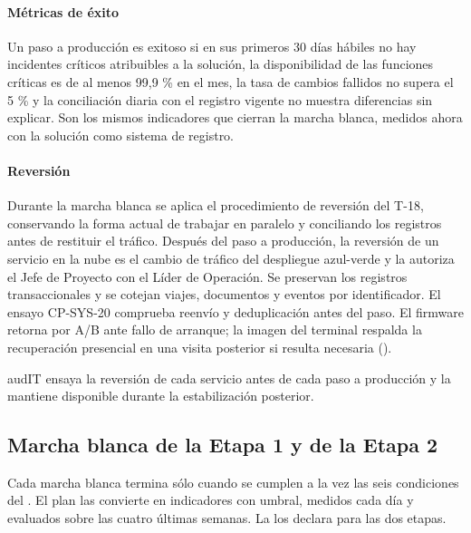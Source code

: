 \paragraph{Métricas de éxito}
Un paso a producción es exitoso si en sus primeros 30 días hábiles no hay incidentes críticos atribuibles
a la solución, la disponibilidad de las funciones críticas es de al menos 99,9 \% en el mes, la tasa de
cambios fallidos no supera el 5 \%  y la conciliación diaria con el registro vigente no
muestra diferencias sin explicar. Son los mismos indicadores que cierran la marcha blanca, medidos ahora
con la solución como sistema de registro.

\paragraph{Reversión}
Durante la marcha blanca se aplica el procedimiento de reversión del T-18, conservando la forma actual de trabajar en paralelo y conciliando los registros antes de restituir el tráfico. Después del paso a producción, la reversión de un servicio en la nube es el cambio
de tráfico del despliegue azul-verde y la autoriza el Jefe de Proyecto con el Líder de Operación. Se preservan los registros transaccionales y se cotejan viajes, documentos y eventos por identificador. El ensayo CP-SYS-20 comprueba reenvío y deduplicación antes del paso. El firmware retorna por A/B ante fallo de arranque; la imagen del terminal respalda la recuperación presencial en una visita posterior si resulta necesaria ().

\begin{compromiso}[metrica={Reversión de un servicio en la nube en no más de 15 minutos, sin pérdida de eventos},
                   verifica={Ensayo de reversión en preproducción antes de cada paso a producción},
                   fuente={\caso{numeral 13.3}{27} y \art{17.1}{12}}]
audIT ensaya la reversión de cada servicio antes de cada paso a producción y la mantiene disponible durante la estabilización posterior.
\end{compromiso}

\subsection{Marcha blanca de la Etapa 1 y de la Etapa 2}\label{sec:7-marcha-blanca}

Cada marcha blanca termina sólo cuando se cumplen a la vez las seis condiciones del . El
plan las convierte en indicadores con umbral, medidos cada día y evaluados sobre las cuatro últimas
semanas. La  los declara para las dos etapas.


